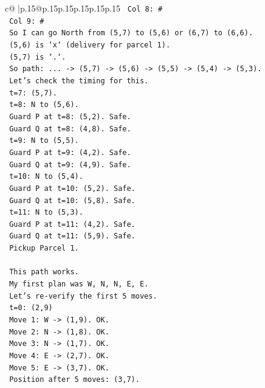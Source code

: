 \documentclass{article}
\begin{document}
{\begin{supertabular}{c@{$\;$}|p{.15\linewidth}@{}p{.15\linewidth}p{.15\linewidth}p{.15\linewidth}p{.15\linewidth}p{.15\linewidth}}
{{{\texttt{  Col 8: \#} \\
\texttt{  Col 9: \#} \\
\texttt{  So I can go North from (5,7) to (5,6) or (6,7) to (6,6).} \\
\texttt{  (5,6) is `x` (delivery for parcel 1).} \\
\texttt{  (5,7) is `.`.} \\
\texttt{  So path: ... {-}> (5,7) {-}> (5,6) {-}> (5,5) {-}> (5,4) {-}> (5,3).} \\
\texttt{  Let's check the timing for this.} \\
\texttt{  t=7: (5,7).} \\
\texttt{  t=8: N to (5,6).} \\
\texttt{    Guard P at t=8: (5,2). Safe.} \\
\texttt{    Guard Q at t=8: (4,8). Safe.} \\
\texttt{  t=9: N to (5,5).} \\
\texttt{    Guard P at t=9: (4,2). Safe.} \\
\texttt{    Guard Q at t=9: (4,9). Safe.} \\
\texttt{  t=10: N to (5,4).} \\
\texttt{    Guard P at t=10: (5,2). Safe.} \\
\texttt{    Guard Q at t=10: (5,8). Safe.} \\
\texttt{  t=11: N to (5,3).} \\
\texttt{    Guard P at t=11: (4,2). Safe.} \\
\texttt{    Guard Q at t=11: (5,9). Safe.} \\
\texttt{    Pickup Parcel 1.} \\
\\ 
\texttt{  This path works.} \\
\texttt{  My first plan was W, N, N, E, E.} \\
\texttt{  Let's re{-}verify the first 5 moves.} \\
\texttt{  t=0: (2,9)} \\
\texttt{  Move 1: W {-}> (1,9). OK.} \\
\texttt{  Move 2: N {-}> (1,8). OK.} \\
\texttt{  Move 3: N {-}> (1,7). OK.} \\
\texttt{  Move 4: E {-}> (2,7). OK.} \\
\texttt{  Move 5: E {-}> (3,7). OK.} \\
\texttt{  Position after 5 moves: (3,7).} \\
\\ 
}}}
\end{supertabular}}
\end{document}
